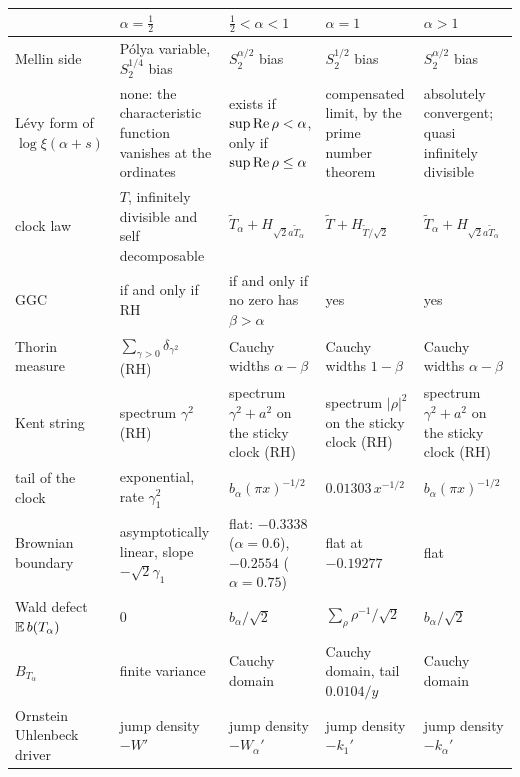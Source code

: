 \begin{table}[htbp]
\centering\scriptsize
\setlength{\tabcolsep}{3pt}
\begin{tabular}{p{}p{}p{}p{}p{}}
\toprule
 & \raggedright $\alpha=\frac12$ & \raggedright $\frac12<\alpha<1$ & \raggedright $\alpha=1$ & $\alpha>1$\tabularnewline
\midrule
\raggedright Mellin side & \raggedright P\'olya variable, $S_2^{1/4}$ bias & \raggedright $S_2^{\alpha/2}$ bias & \raggedright $S_2^{1/2}$ bias & $S_2^{\alpha/2}$ bias\tabularnewline
\raggedright L\'evy form of $\log\xi(\alpha+s)$ & \raggedright none: the characteristic function vanishes at the ordinates & \raggedright exists if $\sup\operatorname{Re}\rho<\alpha$, only if $\sup\operatorname{Re}\rho\le\alpha$ & \raggedright compensated limit, by the prime number theorem & \raggedright absolutely convergent; quasi infinitely divisible\tabularnewline
\raggedright clock law & \raggedright $T$, infinitely divisible and self decomposable & \raggedright $\widetilde T_\alpha+H_{\sqrt2a\widetilde T_\alpha}$ & \raggedright $\widetilde T+H_{\widetilde T/\sqrt2}$ & $\widetilde T_\alpha+H_{\sqrt2a\widetilde T_\alpha}$\tabularnewline
\raggedright GGC & \raggedright if and only if RH & \raggedright if and only if no zero has $\beta>\alpha$ & \raggedright yes & yes\tabularnewline
\raggedright Thorin measure & \raggedright $\sum_{\gamma>0}\delta_{\gamma^2}$ (RH) & \raggedright Cauchy widths $\alpha-\beta$ & \raggedright Cauchy widths $1-\beta$ & Cauchy widths $\alpha-\beta$\tabularnewline
\raggedright Kent string & \raggedright spectrum $\gamma^2$ (RH) & \raggedright spectrum $\gamma^2+a^2$ on the sticky clock (RH) & \raggedright spectrum $|\rho|^2$ on the sticky clock (RH) & \raggedright spectrum $\gamma^2+a^2$ on the sticky clock (RH)\tabularnewline
\raggedright tail of the clock & \raggedright exponential, rate $\gamma_1^2$ & \raggedright $b_\alpha(\pi x)^{-1/2}$ & \raggedright $0.01303\,x^{-1/2}$ & $b_\alpha(\pi x)^{-1/2}$\tabularnewline
\raggedright Brownian boundary & \raggedright asymptotically linear, slope $-\sqrt2\gamma_1$ & \raggedright flat: $-0.3338$ ($\alpha=0.6$), $-0.2554$ ($\alpha=0.75$) & \raggedright flat at $-0.19277$ & flat\tabularnewline
\raggedright Wald defect $\mathbb{E}\,b(T_\alpha)$ & \raggedright $0$ & \raggedright $b_\alpha/\sqrt2$ & \raggedright $\sum_\rho\rho^{-1}/\sqrt2$ & $b_\alpha/\sqrt2$\tabularnewline
\raggedright $B_{T_\alpha}$ & \raggedright finite variance & \raggedright Cauchy domain & \raggedright Cauchy domain, tail $0.0104/y$ & Cauchy domain\tabularnewline
\raggedright Ornstein Uhlenbeck driver & \raggedright jump density $-W'$ & \raggedright jump density $-W_\alpha'$ & \raggedright jump density $-k_1'$ & jump density $-k_\alpha'$\tabularnewline

\end{tabular}
\end{table}
